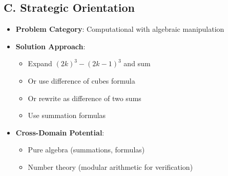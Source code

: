 \documentclass[12pt]{article}
\begin{document}
\begin{problemconfigbox}
\subsection*{C. Strategic Orientation}
\begin{itemize}[leftmargin=*]
    \item \textbf{Problem Category}: Computational with algebraic manipulation
    \item \textbf{Solution Approach}: 
    \begin{itemize}
        \item Expand $(2k)^3 - (2k-1)^3$ and sum
        \item Or use difference of cubes formula
        \item Or rewrite as difference of two sums
        \item Use summation formulas
    \end{itemize}
    \item \textbf{Cross-Domain Potential}: 
    \begin{itemize}
        \item Pure algebra (summations, formulas)
        \item Number theory (modular arithmetic for verification)
    \end{itemize}
\end{itemize}
\end{problemconfigbox}
\end{document}
